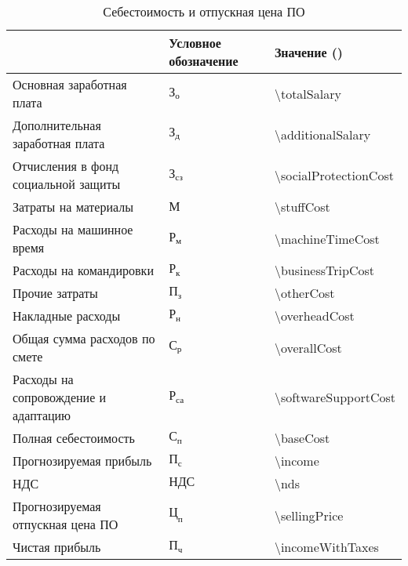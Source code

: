\begin{table}
\caption{Себестоимость и отпускная цена ПО}
\label{table:econ:selfprice}
  \centering
  \begin{tabular}{| >{\centering}m{}
                  | >{\centering}m{}
                  | >{\centering\arraybackslash}m{}|}
    \hline
    {\begin{center}
      Наименование
    \end{center} } & Условное обозначение & Значение (\byr{}) \\
    \hline
    Основная заработная плата & $\text{З}_{\text{о}}$ & \num{\totalSalary} \\
    \hline
    Дополнительная заработная плата & $\text{З}_{\text{д}}$ & \num{\additionalSalary} \\
    \hline
    Отчисления в фонд социальной защиты & $\text{З}_{\text{сз}}$ &\num{\socialProtectionCost} \\
    \hline
    Затраты на материалы & $\text{М}$ &\num{\stuffCost} \\
    \hline
    Расходы на машинное время & $\text{Р}_{\text{м}}$ &\num{\machineTimeCost} \\
    \hline
    Расходы на командировки & $\text{Р}_{\text{к}}$ &\num{\businessTripCost} \\
    \hline
    Прочие затраты & $\text{П}_{\text{з}}$ &\num{\otherCost} \\
    \hline
    Накладные расходы & $\text{Р}_{\text{н}}$ &\num{\overheadCost} \\
    \hline
    Общая сумма расходов по смете & $\text{С}_{\text{р}}$ &\num{\overallCost} \\
    \hline
    Расходы на сопровождение и адаптацию & $\text{Р}_{\text{са}}$ &\num{\softwareSupportCost} \\
    \hline
    Полная себестоимость & $\text{С}_{\text{п}}$ &\num{\baseCost} \\
    \hline
    Прогнозируемая прибыль & $\text{П}_{\text{с}}$ &\num{\income} \\
    \hline
    НДС & $\text{НДС}$ &\num{\nds} \\
    \hline
    Прогнозируемая отпускная цена ПО & $\text{Ц}_{\text{п}}$ &\num{\sellingPrice} \\
    \hline
    Чистая прибыль & $\text{П}_{\text{ч}}$ &\num{\incomeWithTaxes} \\
    \hline
  \end{tabular}
\end{table}
\hfill

